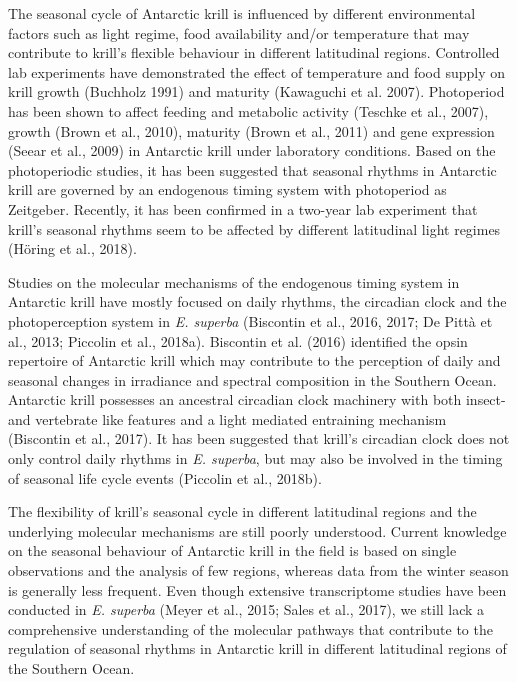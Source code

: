 The seasonal cycle of Antarctic krill is influenced by different environmental
factors such as light regime, food availability and/or temperature that may
contribute to krill's flexible behaviour in different latitudinal regions.
Controlled lab experiments have demonstrated the effect of temperature and food
supply on krill growth (Buchholz 1991) and maturity (Kawaguchi et al. 2007).
Photoperiod has been shown to affect feeding and metabolic activity (Teschke et
al., 2007), growth (Brown et al., 2010), maturity (Brown et al., 2011) and gene
expression (Seear et al., 2009) in Antarctic krill under laboratory conditions.
Based on the photoperiodic studies, it has been suggested that seasonal rhythms
in Antarctic krill are governed by an endogenous timing system with photoperiod
as Zeitgeber. Recently, it has been confirmed in a two-year lab experiment that
krill's seasonal rhythms seem to be affected by different latitudinal light
regimes (Höring et al., 2018).

Studies on the molecular mechanisms of the endogenous timing system in
Antarctic krill have mostly focused on daily rhythms, the circadian clock and
the photoperception system in \textit{E. superba}  (Biscontin et al., 2016,
2017; De Pittà et al., 2013; Piccolin et al., 2018a). Biscontin et al. (2016)
identified the opsin repertoire of Antarctic krill which may contribute to the
perception of daily and seasonal changes in irradiance and spectral composition
in the Southern Ocean. Antarctic krill possesses an ancestral circadian clock
machinery with both insect- and vertebrate like features and a light mediated
entraining mechanism (Biscontin et al., 2017). It has been suggested that
krill's circadian clock does not only control daily rhythms in \textit{E.
superba}, but may also be involved in the timing of seasonal life cycle events
(Piccolin et al., 2018b).

The flexibility of krill's seasonal cycle in different latitudinal regions and
the underlying molecular mechanisms are still poorly understood. Current
knowledge on the seasonal behaviour of Antarctic krill in the field is based on
single observations and the analysis of few regions, whereas data from the
winter season is generally less frequent. Even though extensive transcriptome
studies have been conducted in \textit{E. superba} (Meyer et al., 2015; Sales et
al., 2017), we still lack a comprehensive understanding of the molecular
pathways that contribute to the regulation of seasonal rhythms in Antarctic
krill in different latitudinal regions of the Southern Ocean. 

